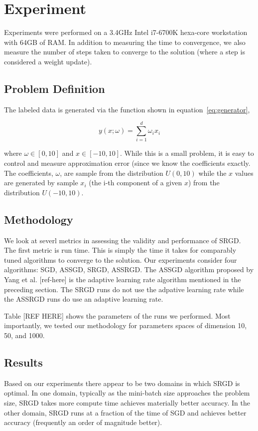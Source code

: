\documentclass[conference,compsoc]{IEEEtran}
\begin{document}
\section{Experiment}
Experiments were performed on a 3.4GHz Intel i7-6700K hexa-core workstation with 64GB
of RAM. In addition to measuring the time to convergence, we also measure the
number of steps taken to converge to the solution (where a step is considered a
weight update).

\subsection{Problem Definition}
The labeled data is generated via the function shown in
equation~\ref{eq:generator},

\begin{equation}\label{eq:generator}
    y(x;\omega) = \sum_{i=1}^d \omega_i x_i
\end{equation}

where $\omega \in [0, 10]$ and $x \in [-10, 10]$. While this is a small problem,
it is easy to control and measure approximation error (since we know the
coefficients exactly. The coefficients, $\omega$, are sample from the
distribution $U(0, 10)$ while the $x$ values are generated by sample $x_i$ (the
i-th component of a given $x$) from the distribution $U(-10,10)$.

\subsection{Methodology}
We look at severl metrics in assessing the validity and performance of SRGD. The
first metric is run time. This is simply the time it takes for comparably tuned
algorithms to converge to the solution. Our experiments consider four
algorithms: SGD, ASSGD, SRGD, ASSRGD. The ASSGD algorithm proposed by Yang et
al. [ref-here] is the adaptive learning rate algorithm mentioned in the
preceding section. The SRGD runs do not use the adpative learning rate while
the ASSRGD runs do use an adaptive learning rate.

Table [REF HERE] shows the parameters of the runs we performed. Most importantly,
we tested our methodology for parameters spaces of dimension 10, 50, and 1000.

\subsection{Results}
Based on our experiments there appear to be two domains in which SRGD is
optimal. In one domain, typically as the mini-batch size approaches the
problem size, SRGD takes more compute time achieves materially better
accuracy. In the other domain, SRGD runs at a fraction of the time of
SGD and achieves better accuracy (frequently an order of magnitude better).
\end{document}
